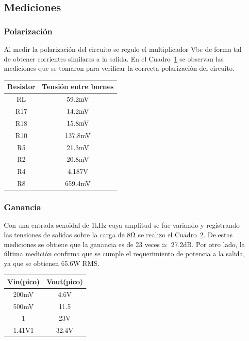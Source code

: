 \subsection{Mediciones}
\bigskip
\subsubsection{Polarización}
Al medir la polarización del circuito se regulo el multiplicador Vbe de forma tal de obtener corrientes similares a la salida. En el Cuadro~\ref{polarizacion} se observan las mediciones que se tomaron para verificar la correcta polarización del circuito.


\begin{table}[H]
\begin{center}
\label{polarizacion} 
\begin{tabular}{|c|c|}
\hline 
\textbf{Resistor} & \textbf{Tensión entre bornes} \\ 
\hline 
RL & $59.2\mvolt$ \\ 
\hline 
R17 & $14.2\mvolt$ \\ 
\hline 
R18 & $15.8\mvolt$ \\ 
\hline 
R10 & 137.8mV \\ 
\hline
R5 & 21.3mV \\ 
\hline
R2 & 20.8mV \\ 
\hline
R4 & 4.187V \\ 
\hline
R8 & 659.4mV \\ 
\hline
\end{tabular} 
\end{center}
\end{table}

\medskip
\subsubsection{Ganancia}
Con una entrada senoidal de 1kHz cuya amplitud se fue variando y registrando las tensiones de salidas sobre la carga de $8\ohm$ se realizo el Cuadro~\ref{ganancia}. De estas mediciones se obtiene que la ganancia es de 23 veces$\simeq$ 27.2dB. Por otro lado, la última medición confirma que se cumple el requerimiento de potencia a la salida, ya que se obtienen 65.6W RMS.


\begin{table}[H]
\begin{center}
\label{ganancia} 
\begin{tabular}{|c|c|}
\hline 
\textbf{Vin(pico)} & \textbf{Vout(pico)} \\ 
\hline 
200mV & 4.6V \\ 
\hline 
500mV & 11.5 \\ 
\hline 
1 & 23V \\ 
\hline 
1.41V1 & 32.4V \\ 
\hline
\end{tabular} 
\end{center}
\end{table}

